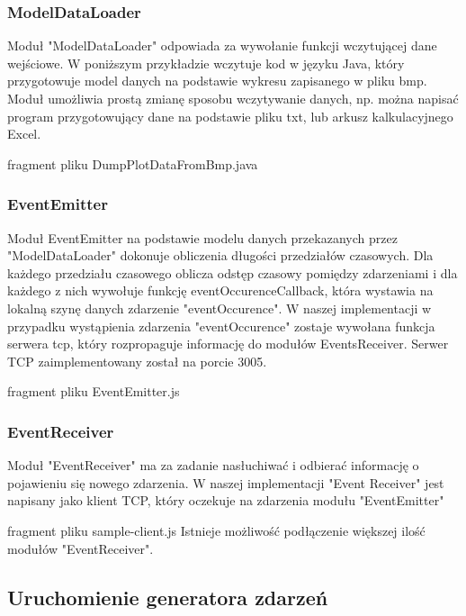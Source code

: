 \subsubsection {ModelDataLoader}
\label{sec:eventgenerator-modeldataloader}

Moduł "ModelDataLoader" odpowiada za wywołanie funkcji wczytującej dane wejściowe. W poniższym przykładzie wczytuje kod w języku Java, który przygotowuje model danych na podstawie wykresu zapisanego w pliku bmp. Moduł umożliwia prostą zmianę sposobu wczytywanie danych, np. można napisać program przygotowujący dane na podstawie pliku txt, lub arkusz kalkulacyjnego Excel.


fragment pliku DumpPlotDataFromBmp.java

\subsubsection{EventEmitter}
Moduł EventEmitter na podstawie modelu danych przekazanych przez "ModelDataLoader" dokonuje obliczenia długości przedziałów czasowych. Dla każdego przedziału czasowego oblicza odstęp czasowy pomiędzy zdarzeniami i dla każdego z nich wywołuje funkcję eventOccurenceCallback, która wystawia na lokalną szynę danych zdarzenie "eventOccurence". W naszej implementacji w przypadku wystąpienia zdarzenia "eventOccurence" zostaje wywołana funkcja serwera tcp, który rozpropaguje informację do modułów EventsReceiver. Serwer TCP zaimplementowany został na porcie 3005.


fragment pliku EventEmitter.js

\subsubsection{EventReceiver}
\label{sec:eventgenerator-eventreceiver}
Moduł "EventReceiver" ma za zadanie nasłuchiwać i odbierać informację o pojawieniu się nowego zdarzenia. W naszej implementacji "Event Receiver" jest napisany jako klient TCP, który oczekuje na zdarzenia modułu "EventEmitter"


fragment pliku sample-client.js
Istnieje możliwość podłączenie większej ilość modułów "EventReceiver".


\subsection{Uruchomienie generatora zdarzeń}
